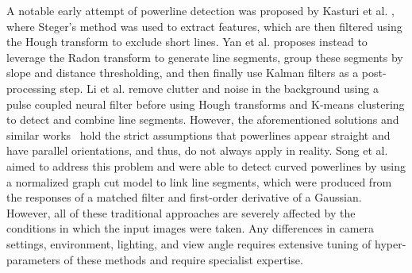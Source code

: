 \documentclass[journal]{IEEEtran}
\begin{document}
A notable early attempt of powerline detection was proposed by Kasturi et al. \cite{related_work_kasturi_2002}, where Steger's method \cite{related_work_steger_1998} was used to extract features, which are then filtered using the Hough transform to exclude short lines. Yan et al. \cite{related_work_guanjian_yan_2007} proposes instead to leverage the Radon transform to generate line segments, group these segments by slope and distance thresholding, and then finally use Kalman filters as a post-processing step. Li et al. \cite{related_work_li_zhenrong_2010} remove clutter and noise in the background using a pulse coupled neural filter before using Hough transforms and K-means clustering to detect and combine line segments. However, the aforementioned solutions and similar works~\cite{related_work_candamo_2009, related_work_golightly_2005, related_work_zhengrong_li_2008, related_work_boris_alpatov_2016} hold the strict assumptions that powerlines appear straight and have parallel orientations, and thus, do not always apply in reality. Song et al. \cite{related_work_biqin_song_2014} aimed to address this problem and were able to detect curved powerlines by using a normalized graph cut model to link line segments, which were produced from the responses of a matched filter and first-order derivative of a Gaussian. However, all of these traditional approaches are severely affected by the conditions in which the input images were taken. Any differences in camera settings, environment, lighting, and view angle requires extensive tuning of hyper-parameters of these methods and require specialist expertise.
\end{document}
